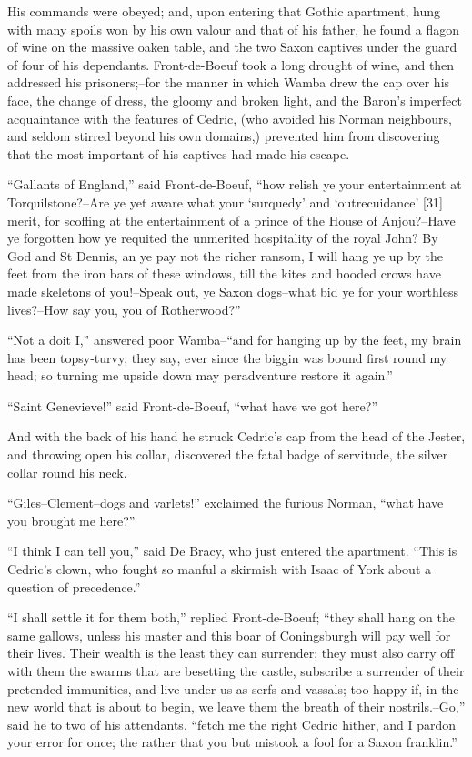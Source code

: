 His commands were obeyed; and, upon entering that Gothic apartment, hung
with many spoils won by his own valour and that of his father, he found
a flagon of wine on the massive oaken table, and the two Saxon captives
under the guard of four of his dependants. Front-de-Boeuf took a long
drought of wine, and then addressed his prisoners;--for the manner in
which Wamba drew the cap over his face, the change of dress, the gloomy
and broken light, and the Baron's imperfect acquaintance with the
features of Cedric, (who avoided his Norman neighbours, and seldom
stirred beyond his own domains,) prevented him from discovering that the
most important of his captives had made his escape.

``Gallants of England,'' said Front-de-Boeuf, ``how relish ye your
entertainment at Torquilstone?--Are ye yet aware what your `surquedy'
and `outrecuidance' {[}31{]} merit, for scoffing at the entertainment of
a prince of the House of Anjou?--Have ye forgotten how ye requited the
unmerited hospitality of the royal John? By God and St Dennis, an ye pay
not the richer ransom, I will hang ye up by the feet from the iron bars
of these windows, till the kites and hooded crows have made skeletons of
you!--Speak out, ye Saxon dogs--what bid ye for your worthless
lives?--How say you, you of Rotherwood?''

``Not a doit I,'' answered poor Wamba--``and for hanging up by the feet,
my brain has been topsy-turvy, they say, ever since the biggin was bound
first round my head; so turning me upside down may peradventure restore
it again.''

``Saint Genevieve!'' said Front-de-Boeuf, ``what have we got here?''

And with the back of his hand he struck Cedric's cap from the head of
the Jester, and throwing open his collar, discovered the fatal badge of
servitude, the silver collar round his neck.

``Giles--Clement--dogs and varlets!'' exclaimed the furious Norman,
``what have you brought me here?''

``I think I can tell you,'' said De Bracy, who just entered the
apartment. ``This is Cedric's clown, who fought so manful a skirmish
with Isaac of York about a question of precedence.''

``I shall settle it for them both,'' replied Front-de-Boeuf; ``they
shall hang on the same gallows, unless his master and this boar of
Coningsburgh will pay well for their lives. Their wealth is the least
they can surrender; they must also carry off with them the swarms that
are besetting the castle, subscribe a surrender of their pretended
immunities, and live under us as serfs and vassals; too happy if, in the
new world that is about to begin, we leave them the breath of their
nostrils.--Go,'' said he to two of his attendants, ``fetch me the right
Cedric hither, and I pardon your error for once; the rather that you but
mistook a fool for a Saxon franklin.''

